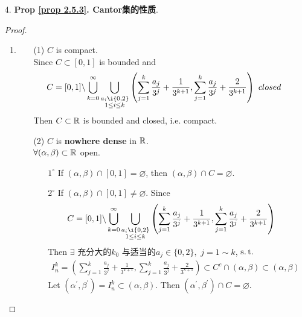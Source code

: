 	\newpage
	
	\begin{enumerate}
		\item[4.] \textbf{Prop \ref{prop 2.5.3}. Cantor集的性质}. \\
		\begin{proof}
			\begin{enumerate}
				\item 
				\begin{enumerate}
					\item[(1)] $C$ is compact. \\
					Since $C \subset [0 , 1]$ is bounded and
					\begin{align}
						C = [0 , 1] \backslash \bigcup_{k = 0}^{\infty} \bigcup_{\substack{a_i \i \{ 0 , 2 \} \\ 1 \leq i \leq k}} \left( \sum_{j = 1}^{k}{\frac{a_j}{3^j}} + \frac{1}{3^{k + 1}} , \sum_{j = 1}^{k}{\frac{a_j}{3^j}} + \frac{2}{3^{k + 1}} \right) \,\, closed
					\end{align}
					Then $C \subset \mathbb{R}$ is bounded and closed, i.e. compact.
					
					\vspace*{8em}
					
					\item[(2)] $C$ is \textbf{nowhere dense} in $\mathbb{R}$. \\
					$\forall (\alpha , \beta) \subset \mathbb{R}$ open.
					\begin{enumerate}
						\item[$1^{\circ}$] If $(\alpha , \beta) \cap [0 , 1] = \varnothing$, then $(\alpha , \beta) \cap C = \varnothing$.
						
						\vspace*{2em}
						
						\item[$2^{\circ}$] If $(\alpha , \beta) \cap [0 , 1] \neq \varnothing$. Since
						\begin{align}
							C = [0 , 1] \backslash \bigcup_{k = 0}^{\infty} \bigcup_{\substack{a_i \i \{ 0 , 2 \} \\ 1 \leq i \leq k}} \left( \sum_{j = 1}^{k}{\frac{a_j}{3^j}} + \frac{1}{3^{k + 1}} , \sum_{j = 1}^{k}{\frac{a_j}{3^j}} + \frac{2}{3^{k + 1}} \right)
						\end{align}
						Then $\exists$ 充分大的$k_0$ 与适当的$a_j \in \{ 0 , 2 \} , \,\, j = 1 \sim k$, $\operatorname{s.t.}$
						\begin{align}
							I_{n}^{k} = \left( \sum_{j = 1}^{k}{\frac{a_j}{3^j}} + \frac{1}{3^{k + 1}} , \sum_{j = 1}^{k}{\frac{a_j}{3^j}} + \frac{2}{3^{k + 1}} \right) \subset C^c \cap (\alpha , \beta) \subset (\alpha , \beta)
						\end{align}
						Let $(\alpha^{'} , \beta^{'}) = I_{n}^{k} \subset (\alpha , \beta)$. Then $(\alpha^{'} , \beta^{'}) \cap C = \varnothing$.
					\end{enumerate}
					

\end{enumerate}
\end{enumerate}
\end{proof}
\end{enumerate}
